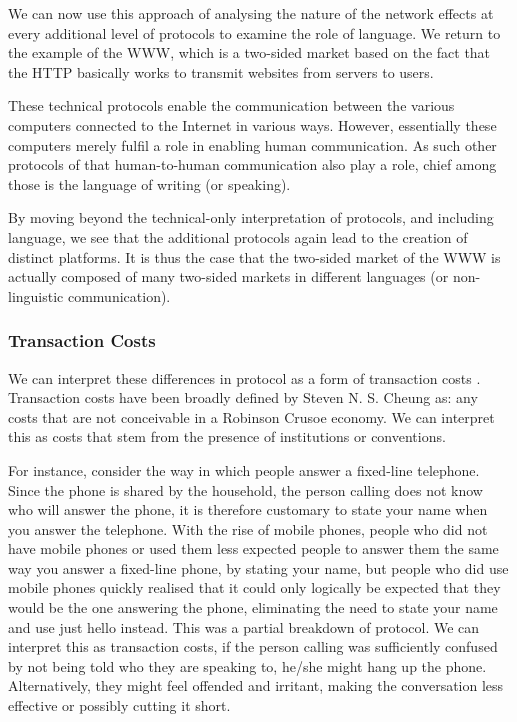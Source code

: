 \documentclass[a4paper,british]{article}\usepackage[]{graphicx}\usepackage[]{color}
\begin{document}
We can now use this approach of analysing the nature of the network
effects at every additional level of protocols to examine the role
of language. We return to the example of the WWW, which is a two-sided
market based on the fact that the HTTP basically works to transmit
websites from servers to users. 

These technical protocols enable the communication between the various
computers connected to the Internet in various ways. However, essentially
these computers merely fulfil a role in enabling human communication.
As such other protocols of that human-to-human communication also
play a role, chief among those is the language of writing (or speaking).

By moving beyond the technical-only interpretation of protocols, and
including language, we see that the additional protocols again lead
to the creation of distinct platforms. It is thus the case that the
two-sided market of the WWW is actually composed of many two-sided
markets in different languages (or non-linguistic communication). 

\subsubsection*{Transaction Costs}

We can interpret these differences in protocol as a form of transaction
costs \citep{coase1937nature}. Transaction costs have been broadly
defined by Steven N. S. Cheung as: \textquotedbl any costs that are
not conceivable in a \textquotedbl Robinson Crusoe economy\textquotedbl .
We can interpret this as costs that stem from the presence of institutions
or conventions.

For instance, consider the way in which people answer a fixed-line
telephone. Since the phone is shared by the household, the person
calling does not know who will answer the phone, it is therefore customary
to state your name when you answer the telephone. With the rise of
mobile phones, people who did not have mobile phones or used them
less expected people to answer them the same way you answer a fixed-line
phone, by stating your name, but people who did use mobile phones
quickly realised that it could only logically be expected that they
would be the one answering the phone, eliminating the need to state
your name and use just \textquotedbl hello\textquotedbl{} instead.
This was a partial breakdown of protocol. We can interpret this as
transaction costs, if the person calling was sufficiently confused
by not being told who they are speaking to, he/she might hang up the
phone. Alternatively, they might feel offended and irritant, making
the conversation less effective or possibly cutting it short.
\end{document}
